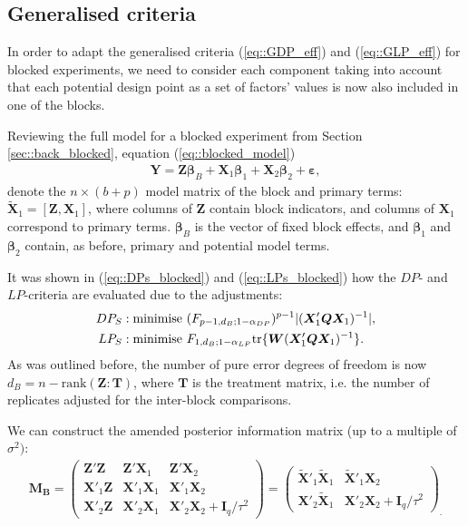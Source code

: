 \subsection{Generalised criteria}
In order to adapt the generalised criteria (\ref{eq::GDP_eff}) and (\ref{eq::GLP_eff}) for blocked experiments, we need to consider each component taking into account that each potential design point as a set of factors' values is now also included in one of the blocks.

Reviewing the full model for a blocked experiment from Section \ref{sec::back_blocked}, equation (\ref{eq::blocked_model})
\begin{align*}
\bm{Y}=\bm{Z\beta}_{B}+\bm{X}_{1}\bm{\beta}_{1}+\bm{X}_{2}\bm{\beta}_{2}+\bm{\varepsilon},
\end{align*}
denote the $n\times(b+p)$ model matrix of the block and primary terms: 
$\tilde{\bm{X}}_{1}=[\bm{Z},\bm{X}_{1}]$, where  columns of $\bm{Z}$ contain block indicators, and columns of $\bm{X}_{1}$ correspond to primary terms. $\bm{\beta}_{B}$ is the vector of fixed block effects, and $\bm{\beta}_1$ and $\bm{\beta}_2$ contain, as before, primary and potential model terms.

It was shown in (\ref{eq::DPs_blocked}) and (\ref{eq::LPs_blocked}) how the $DP$- and $LP$-criteria are evaluated due to the adjustments:
\begin{align*}
DP_S: \mbox{minimise } &(F_{p-1,d_B;1-\alpha_{DP}})^{p-1}\vert (\bm{X}'_{1}\bm{Q}\bm{X}_{1})^{-1}\vert,\notag\\
LP_S: \mbox{minimise } &F_{1,d_B;1-\alpha_{LP}}\mbox{tr}\{\bm{W}(\bm{X}'_{1}\bm{Q}\bm{X}_{1})^{-1}\}.
\end{align*}
As was outlined before, the number of pure error degrees of freedom is now $d_B=n-\mbox{rank}(\bm{Z}:\bm{T})$, where $\bm{T}$ is the treatment matrix, i.e. the number of replicates adjusted for the inter-block comparisons.

We can construct the amended posterior information matrix (up to a multiple of $\sigma^2)$:
\begin{align*}
\bm{M_B}=
\begin{pmatrix}
\bm{Z}'\bm{Z} & \bm{Z}'\bm{X}_{1} & \bm{Z}'\bm{X}_{2}\\
\bm{X}'_{1}\bm{Z} & \bm{X}'_{1}\bm{X}_{1} & \bm{X}'_{1}\bm{X}_{2}\\
\bm{X}'_{2}\bm{Z} & \bm{X}'_{2}\bm{X}_{1} & \bm{X}'_{2}\bm{X}_{2}+\bm{I}_{q}/\tau^2
\end{pmatrix}
=
\begin{pmatrix}
\bm{\tilde{X}}'_{1}\bm{\tilde{X}}_{1} & \bm{\tilde{X}}'_{1}\bm{X}_{2}\\
\bm{X}'_{2}\bm{\tilde{X}}_{1} & \bm{X}'_{2}\bm{X}_{2}+\bm{I}_{q}/\tau^2
\end{pmatrix}_{.}
\end{align*} 

